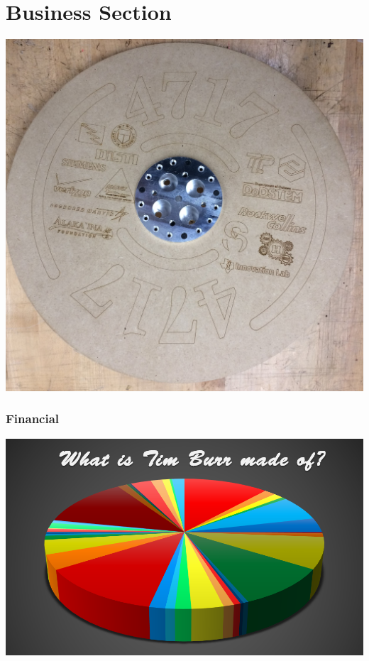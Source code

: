 \documentclass[
letterpaper, %
11pt, %
onecolumn, %
openany, %
]{article}
\begin{document}
\cleardoublepage
\part{Business Section}
\vspace{3em}
\begin{minipage}[c]{\linewidth}
\centering
\includegraphics[width=\linewidth]{Images/Main/Big_wheel.JPG}
\end{minipage}



                                            
\section{Financial}
\vspace{3em}
\begin{minipage}[c]{\linewidth}
\centering
\includegraphics[width=\linewidth]{Images/Main/finance_cover_pic.png}
\end{minipage}
\end{document}
